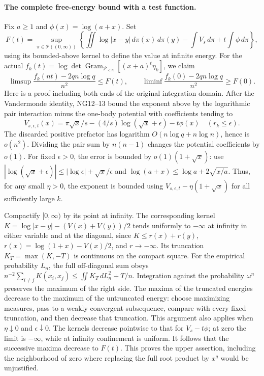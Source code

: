 \documentclass[11pt]{article}
\newcommand{\PP}{\mathcal P}\newcommand{\dd}{\,d}
\begin{document}
\paragraph{The complete free-energy bound with a test function.}
Fix $a\ge1$ and $\phi(x)=\log(a+x)$. Set
\[
 F(t)=\sup_{\pi\in\mathcal P((0,\infty))}
 \left\{\iint\log|x-y|\dd\pi(x)\dd\pi(y)
            -\int V_s\dd\pi+t\int\phi\dd\pi\right\},
\]
using its bounded-above kernel to define the value at infinite energy.
For the actual $f_k(t)=\log\det\operatorname{Gram}_{\PP_{<n}}
 [(x+a)^t\eta_k]$, we claim
\begin{equation}\tag{NG14}
 \limsup\frac{f_k(nt)-2qn\log q}{n^2}\le F(t),\qquad
 \liminf\frac{f_k(0)-2qn\log q}{n^2}\ge F(0).
\end{equation}
Here is a proof including both ends of the original integration domain.
After the Vandermonde identity, NG12--13 bound the exponent above by
the logarithmic pair interaction minus the one-body potential with
coefficients tending to
\[
 V_{s,\epsilon,t}(x)=\pi\sqrt x/s-(4/s)\log(\sqrt x+\epsilon)-t\phi(x)
 \quad(r_k\le\epsilon).
\]
The discarded positive prefactor has logarithm $O(n\log q+n\log n)$,
hence is $o(n^2)$. Dividing the pair sum by $n(n-1)$ changes the
potential coefficients by $o(1)$. For fixed $\epsilon>0$, the error
is bounded by $o(1)(1+\sqrt x)$: use
$|\log(\sqrt x+\epsilon)|\le |\log\epsilon|+\sqrt x/\epsilon$
and $\log(a+x)\le\log a+2\sqrt{x/a}$.
Thus, for any small $\eta>0$, the exponent is bounded using
$V_{s,\epsilon,t}-\eta(1+\sqrt x)$ for all sufficiently large $k$.

Compactify $[0,\infty)$ by its point at infinity. The corresponding
kernel $K=\log|x-y|-(V(x)+V(y))/2$ tends uniformly to $-\infty$ at
infinity in either variable and at the diagonal, since
$K\le r(x)+r(y)$, $r(x)=\log(1+x)-V(x)/2$, and $r\to-\infty$.
Its truncation $K_T=\max(K,-T)$ is continuous on the compact square.
For the empirical probability $L_n$, the full off-diagonal sum obeys
$n^{-2}\sum_{i\ne j}K(x_i,x_j)\le\iint K_T\dd L_n^2+T/n$.
Integration against the probability $\omega^n$ preserves the maximum
of the right side. The maxima of the truncated energies decrease to
the maximum of the untruncated energy: choose maximizing measures,
pass to a weakly convergent subsequence, compare with every fixed
truncation, and then decrease that truncation. This argument also
applies when $\eta\downarrow0$ and $\epsilon\downarrow0$.
The kernels decrease pointwise to that for $V_s-t\phi$; at zero
the limit is $-\infty$, while at infinity confinement is uniform.
It follows that the successive maxima decrease to $F(t)$.
This proves the upper assertion, including the neighborhood of zero
where replacing the full root product by $x^q$ would be unjustified.
\end{document}
